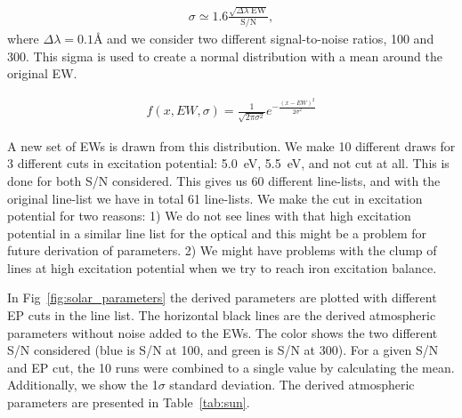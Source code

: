 \documentclass{aa}
\begin{document}
\begin{align}
    \sigma \simeq 1.6 \frac{\sqrt{\Delta\lambda\; \mathrm{EW}}}{\mathrm{S/N}},
\end{align}
where $\Delta\lambda=0.1\si{\angstrom}$ and we consider two different
signal-to-noise ratios, 100 and 300. This sigma is used to create a
normal distribution with a mean around the original EW.

\begin{align}
    f(x, EW, \sigma) = \frac{1}{\sqrt{2\pi\sigma^2}} e^{-\frac{(x-EW)^2}{2\sigma^2}}
\end{align}

A new set of EWs is drawn from this distribution. We make 10 different
draws for 3 different cuts in excitation potential: \SI{5.0}{eV},
\SI{5.5}{eV}, and not cut at all. This is done for both S/N considered.
This gives us 60 different line-lists, and with the original line-list
we have in total 61 line-lists. We make the cut in excitation
potential for two reasons: 1) We do not see lines with that high
excitation potential in a similar line list for the optical \citep[see
e.g.][]{Tsantaki2013} and this might be a problem for future derivation
of parameters. 2) We might have problems with the clump of lines at high
excitation potential when we try to reach iron excitation balance.

In Fig~\ref{fig:solar_parameters} the derived parameters are plotted
with different EP cuts in the line list. The horizontal black lines
are the derived atmospheric parameters without noise added to the EWs.
The color shows the two different S/N considered (blue is S/N at 100,
and green is S/N at 300). For a given S/N and EP cut, the 10 runs were
combined to a single value by calculating the mean. Additionally,
we show the 1$\sigma$ standard deviation. The derived atmospheric
parameters are presented in Table~\ref{tab:sun}.
\end{document}
